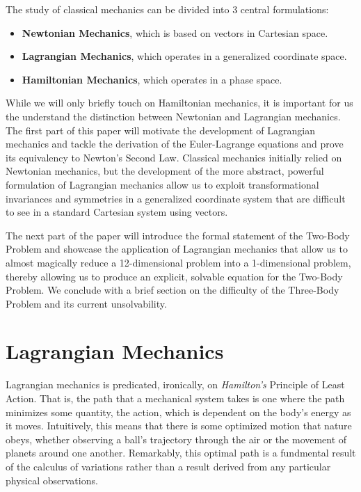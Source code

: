 \documentclass[psamsfonts]{amsart}
\theoremstyle{definition}
\theoremstyle{remark}
\numberwithin{equation}{section}
\begin{document}
The study of classical mechanics can be divided into 3 central formulations:
\begin{itemize}
  \item[] \textbf{Newtonian Mechanics}, which is based on vectors in Cartesian space.
  \item[] \textbf{Lagrangian Mechanics}, which operates in a generalized coordinate space.
  \item[] \textbf{Hamiltonian Mechanics}, which operates in a phase space.
\end{itemize}
While we will only briefly touch on Hamiltonian mechanics, it is important for us the understand the distinction between Newtonian and Lagrangian mechanics. The first part of this paper will motivate the development of Lagrangian mechanics and tackle the derivation of the Euler-Lagrange equations and prove its equivalency to Newton's Second Law. Classical mechanics initially relied on Newtonian mechanics, but the development of the more abstract, powerful formulation of Lagrangian mechanics allow us to exploit transformational invariances and symmetries in a generalized coordinate system that are difficult to see in a standard Cartesian system using vectors.

The next part of the paper will introduce the formal statement of the Two-Body Problem and showcase the application of Lagrangian mechanics that allow us to almost magically reduce a 12-dimensional problem into a 1-dimensional problem, thereby allowing us to produce an explicit, solvable equation for the Two-Body Problem. We conclude with a brief section on the difficulty of the Three-Body Problem and its current unsolvability.

\section{Lagrangian Mechanics}
Lagrangian mechanics is predicated, ironically, on \textit{Hamilton's} Principle of Least Action. That is, the path that a mechanical system takes is one where the path minimizes some quantity, the action, which is dependent on the body's energy as it moves. Intuitively, this means that there is some optimized motion that nature obeys, whether observing a ball's trajectory through the air or the movement of planets around one another. Remarkably, this optimal path is a fundmental result of the calculus of variations rather than a result derived from any particular physical observations.
\end{document}
